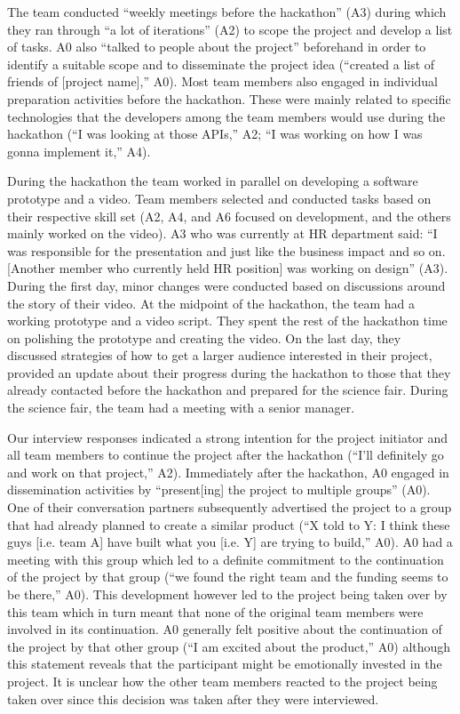 \documentclass{hcij}
\begin{document}
The team conducted “weekly meetings before the hackathon” (A3) during which they ran through “a lot of iterations” (A2) to scope the project and develop a list of tasks. A0 also “talked to people about the project” beforehand in order to identify a suitable scope and to disseminate the project idea (“created a list of friends of [project name],” A0). Most team members also engaged in individual preparation activities before the hackathon. These were mainly related to specific technologies that the developers among the team members would use during the hackathon (“I was looking at those APIs,” A2; “I was working on how I was gonna implement it,” A4).

During the hackathon the team worked in parallel on developing a software prototype and a video. Team members selected and conducted tasks based on their respective skill set (A2, A4, and A6 focused on development, and the others mainly worked on the video). A3 who was currently at HR department said: “I was responsible for the presentation and just like the business impact and so on. [Another member who currently held HR position] was working on design” (A3). During the first day, minor changes were conducted based on discussions around the story of their video. At the midpoint of the hackathon, the team had a working prototype and a video script. They spent the rest of the hackathon time on polishing the prototype and creating the video. On the last day, they discussed strategies of how to get a larger audience interested in their project, provided an update about their progress during the hackathon to those that they already contacted before the hackathon and prepared for the science fair. During the science fair, the team had a meeting with a senior manager.

Our interview responses indicated a strong intention for the project initiator and all team members to continue the project after the hackathon (“I’ll definitely go and work on that project,” A2). Immediately after the hackathon, A0 engaged in dissemination activities by “present[ing] the project to multiple groups” (A0). One of their conversation partners subsequently advertised the project to a group that had already planned to create a similar product (“X told to Y: I think these guys [i.e. team A] have built what you [i.e. Y] are trying to build,” A0). A0 had a meeting with this group which led to a definite commitment to the continuation of the project by that group (“we found the right team and the funding seems to be there,” A0). This development however led to the project being taken over by this team which in turn meant that none of the original team members were involved in its continuation. A0 generally felt positive about the continuation of the project by that other group (“I am excited about the product,” A0) although this statement reveals that the participant might be emotionally invested in the project. It is unclear how the other team members reacted to the project being taken over since this decision was taken after they were interviewed.
\end{document}
